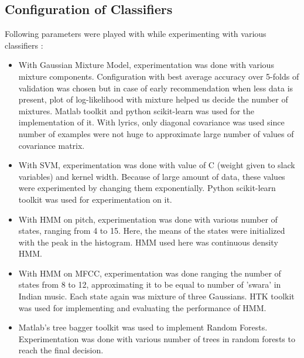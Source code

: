 \subsection{Configuration of Classifiers} Following parameters were played with while experimenting with various classifiers :
\begin{itemize}
\item With Gaussian Mixture Model, experimentation was done with various mixture components. Configuration with best average accuracy over 5-folds of validation was chosen but in case of early recommendation when less data is present, plot of log-likelihood with mixture helped us decide the number of mixtures. Matlab toolkit and python scikit-learn was used for the implementation of it. With lyrics, only diagonal covariance was used since number of examples were not huge to approximate large number of values of covariance matrix.

\item With SVM, experimentation was done with value of C (weight given to slack variables) and kernel width. Because of large amount of data, these values were experimented by changing them exponentially. Python scikit-learn toolkit was used for experimentation on it.
\item With HMM on pitch, experimentation was done with various number of states, ranging from 4 to 15. Here, the means of the states were initialized with the peak in the histogram. HMM used here was continuous density HMM.
\item With HMM on MFCC, experimentation was done ranging the number of states from 8 to 12, approximating it to be equal to number of 'swara' in Indian music. Each state again was mixture of three Gaussians. HTK toolkit was used for implementing and evaluating the performance of HMM.
\item Matlab's tree bagger toolkit was used to implement Random Forests. Experimentation was done with various number of trees in random forests to reach the final decision.
\end{itemize}
